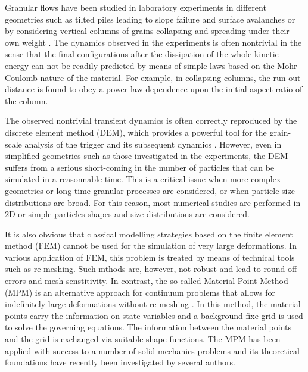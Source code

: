 Granular flows have been studied in laboratory experiments in different 
geometries such as tilted piles leading to slope failure and surface avalanches 
\citep{Legros2002, Iverson1997} or by considering vertical columns 
of grains collapsing and spreading under their own weight 
\citep{Lajeunesse2004, 
Lajeunesse2005}. The dynamics observed in the experiments is often nontrivial 
in the sense that the final configurations after the dissipation of the whole 
kinetic energy  
can not be readily predicted by means of simple laws based on the Mohr-Coulomb 
nature 
of the material. For example, in collapsing columns, the run-out distance 
is found to obey a power-law dependence upon the initial aspect ratio of the 
column. 

The observed nontrivial transient dynamics is often correctly 
reproduced by the discrete element method (DEM), which provides 
a powerful tool for the grain-scale analysis of the 
trigger and its subsequent dynamics \citep{Staron2005, Staron2009}. 
However, even in simplified geometries such as those 
investigated in the experiments, the DEM suffers from a serious 
short-coming in the number of particles that can be simulated in 
a reasonnable time. This is a critical issue when more complex geometries or 
long-time granular processes are considered, or when particle size 
distributions are broad. For this reason, most numerical studies 
are performed in 2D or simple particles shapes and size distributions 
are considered. 

It is also obvious that classical modelling strategies based on 
the finite element method (FEM) cannot be used for the 
simulation of very large deformations. In various application of FEM, 
this problem is treated by means of technical tools such 
as re-meshing. Such mthods are, however, not robust and lead 
to round-off errors and mesh-senstitivity. In contrast, the so-called 
Material Point Method (MPM) is an alternative approach for 
continuum problems that allows for indefinitely large deformations 
without re-meshing \cite{Sulski??}. In this method, the material points carry 
the information 
on state variables and a background fixe grid is used to solve the governing 
equations. 
The information between the material points and the grid is exchanged via 
suitable shape functions. The MPM has been applied with success to 
a number of solid mechanics problems and its theoretical foundations 
have recently been investigated by several authors. 

